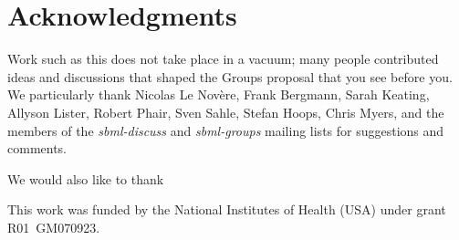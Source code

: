 
\section{Acknowledgments}

Work such as this does not take place in a vacuum; many people contributed ideas and discussions that shaped the Groups proposal that you see before you.  We particularly thank Nicolas Le Nov\`{e}re, Frank Bergmann, Sarah Keating, Allyson Lister, Robert Phair, Sven Sahle, Stefan Hoops, Chris Myers, and the members of the \emph{sbml-discuss} and \emph{sbml-groups} mailing lists for suggestions and comments.

We would also like to thank 

This work was funded by the National Institutes of Health (USA) under grant R01~GM070923.
